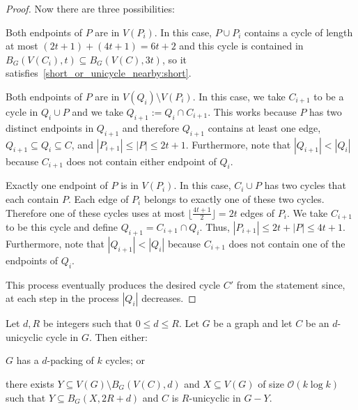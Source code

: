 \documentclass{patmorin}
\newcommand{\piotr}[1]{\textcolor{red}{Piotr: #1}}
\newcommand{\Oh}{\mathcal{O}}
\begin{document}
\begin{proof}
  Now there are three possibilities:
  \begin{compactenum}
    \item Both endpoints of $P$ are in $V(P_{i})$.
    In this case, $P\cup P_{i}$ contains a cycle of length at most
    $(2t+1)+(4t+1)=6t+2$ and this cycle is contained in $B_G(V(C_i),t)\subseteq B_G(V(C),3t)$, so it satisfies~\eqref{short_or_unicycle_nearby:short}.
    \item Both endpoints of $P$ are in $V(Q_{i})\setminus V(P_{i})$.
    In this case, we take $C_{i+1}$ to be a cycle in $Q_{i}\cup P$ and
    we take $Q_{i+1}:= Q_i\cap C_{i+1}$. %
    This works because $P$ has two distinct endpoints in $Q_{i+1}$
    and therefore $Q_{i+1}$ contains at least one edge,
    $Q_{i+1}\subseteq Q_i\subseteq C$, and
    $|P_{i+1}|\leq|P|\leq 2t+1$.
    Furthermore, note that $|Q_{i+1}| < |Q_{i}|$ because $C_{i+1}$ does not contain either endpoint of $Q_{i}$.
    \item Exactly one endpoint of $P$ is in $V(P_{i})$.
    In this case, $C_{i}\cup P$ has two cycles that each contain $P$.
    Each edge of $P_{i}$ belongs to exactly one of these two cycles.
    Therefore one of these cycles uses at most $\lfloor\frac{4t+1}{2}\rfloor=2t$ edges of $P_{i}$.
    We take $C_{i+1}$ to be this cycle and define
    $Q_{i+1}=C_{i+1}\cap Q_i$. %
    Thus, $|P_{i+1}| \leq 2t+|P|\leq 4t+1$.
    Furthermore, note that $|Q_{i+1}| < |Q_{i}|$ because $C_{i+1}$ does not contain one of the endpoints of $Q_{i}$.
  \end{compactenum}
  This process eventually produces the desired cycle $C'$ from the statement since, at each step in the process $|Q_i|$ decreases.
\end{proof}

\begin{lem}\label{grow_unicycle}
  Let $d,R$ be integers such that $0\leq d \leq R$. 
  Let $G$ be a graph and let $C$ be an $d$-unicyclic cycle in $G$. 
  Then either:
  \begin{compactenum}[(a)]
    \item $G$ has a $d$-packing of $k$ cycles; or
    \label{grow_unicycle:item:packing}
    \item %
    there exists $Y\subseteq V(G)\setminus B_G(V(C),d)$ and $X\subseteq V(G)$ of size $\Oh(k\log k)$ such that $Y\subseteq B_G(X,2R+d)$ and
    $C$ is $R$-unicyclic in $G-Y$.  
  \end{compactenum}
\end{lem}
\end{document}
